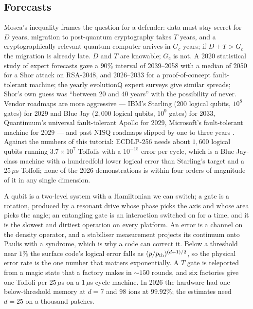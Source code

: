 \subsection{Forecasts}

Mosca's inequality frames the question for a defender: data must stay secret for $D$ years,
migration to post-quantum cryptography takes $T$ years, and a cryptographically relevant
quantum computer arrives in $G_c$ years; if $D+T>G_c$ the migration is already late. $D$ and $T$
are knowable; $G_c$ is not. A 2020 statistical study of expert forecasts gave a $90\%$ interval of
2039--2058 with a median of 2050 for a Shor attack on RSA-2048, and 2026--2033 for a
proof-of-concept fault-tolerant machine; the yearly evolutionQ expert surveys give similar
spreads; Shor's own guess was ``between 20 and 40 years'' with the possibility of never. Vendor
roadmaps are more aggressive --- IBM's Starling (200 logical qubits, $10^8$ gates) for 2029 and
Blue Jay ($2,000$ logical qubits, $10^9$ gates) for 2033, Quantinuum's universal fault-tolerant
Apollo for 2029, Microsoft's fault-tolerant machine for 2029 --- and past NISQ roadmaps slipped
by one to three years \cite{ph:uqt26}. Against the numbers of this tutorial: ECDLP-256 needs
about $1,600$ logical qubits running $3.7\times10^7$ Toffolis with a $10^{-15}$ error per cycle,
which is a Blue Jay-class machine with a hundredfold lower logical error than Starling's target
and a $25\,\mu$s Toffoli; none of the 2026 demonstrations is within four orders of magnitude of it
in any single dimension.

\begin{keybox}[title={The physics, in one line each}]
A qubit is a two-level system with a Hamiltonian we can switch; a gate is a rotation, produced by
a resonant drive whose phase picks the axis and whose area picks the angle; an entangling gate is
an interaction switched on for a time, and it is the slowest and dirtiest operation on every
platform. An error is a channel on the density operator, and a stabiliser measurement projects
its continuum onto Paulis with a syndrome, which is why a code can correct it. Below a threshold
near $1\%$ the surface code's logical error falls as $(p/p_{\rm th})^{(d+1)/2}$, so the physical
error rate is the one number that matters exponentially. A $T$ gate is teleported from a magic
state that a factory makes in $\sim150$ rounds, and six factories give one Toffoli per
$25\,\mu$s on a $1\,\mu$s-cycle machine. In 2026 the hardware had one below-threshold memory at
$d=7$ and $98$ ions at $99.92\%$; the estimates need $d=25$ on a thousand patches.
\end{keybox}

